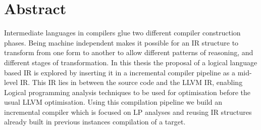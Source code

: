 \chapter{Abstract}

Intermediate languages in compilers glue two different compiler construction
phases. Being machine independent makes it possible for an IR structure to
transform from one form to another to allow different patterns of reasoning,
and different stages of transformation. In this thesis the proposal of a
logical language based IR is explored by inserting it in a incremental compiler
pipeline as a mid-level IR. This IR lies in between the source code and the
LLVM IR, enabling Logical programming analysis techniques to be used for
optimisation before the usual LLVM optimisation. Using this compilation
pipeline we build an incremental compiler which is focused on LP analyses and
reusing IR structures already built in previous instances compilation of a
target.








